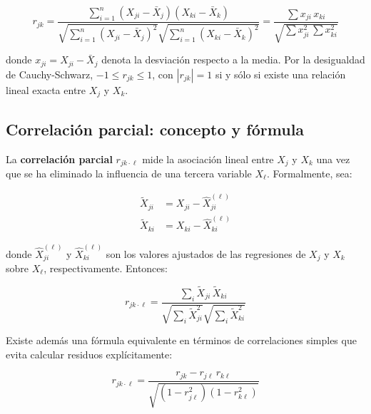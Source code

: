 \documentclass[12pt, letterpaper]{article}
\theoremstyle{remark}
\newcommand{\rp}[2]{r_{#1 \cdot #2}}   %
\begin{document}
\begin{equation}
  r_{jk}
    = \frac{\displaystyle\sum_{i=1}^{n}(X_{ji}-\bar{X}_j)(X_{ki}-\bar{X}_k)}
           {\sqrt{\displaystyle\sum_{i=1}^{n}(X_{ji}-\bar{X}_j)^2}
            \sqrt{\displaystyle\sum_{i=1}^{n}(X_{ki}-\bar{X}_k)^2}}
    = \frac{\sum x_{ji}\,x_{ki}}{\sqrt{\sum x_{ji}^2\,\sum x_{ki}^2}}
  \label{eq:pearson}
\end{equation}

\noindent donde $x_{ji} = X_{ji} - \bar{X}_j$ denota la desviación respecto a la
media. Por la desigualdad de Cauchy-Schwarz, $-1 \le r_{jk} \le 1$, con
$|r_{jk}| = 1$ si y sólo si existe una relación lineal exacta entre $X_j$ y
$X_k$.

\subsection{Correlación parcial: concepto y fórmula}

La \textbf{correlación parcial} $\rp{jk}{\ell}$ mide la asociación lineal entre
$X_j$ y $X_k$ una vez que se ha eliminado la influencia de una tercera variable
$X_\ell$. Formalmente, sea:

\begin{align}
  \tilde{X}_{ji} &= X_{ji} - \hat{X}_{ji}^{(\ell)}
  \label{eq:resid_j}\\
  \tilde{X}_{ki} &= X_{ki} - \hat{X}_{ki}^{(\ell)}
  \label{eq:resid_k}
\end{align}

\noindent donde $\hat{X}_{ji}^{(\ell)}$ y $\hat{X}_{ki}^{(\ell)}$ son los
valores ajustados de las regresiones de $X_j$ y $X_k$ sobre $X_\ell$,
respectivamente. Entonces:

\begin{equation}
  \rp{jk}{\ell}
    = \frac{\displaystyle\sum_{i} \tilde{X}_{ji}\,\tilde{X}_{ki}}
           {\sqrt{\displaystyle\sum_{i}\tilde{X}_{ji}^2}
            \sqrt{\displaystyle\sum_{i}\tilde{X}_{ki}^2}}
  \label{eq:parcial_def}
\end{equation}

Existe además una fórmula equivalente en términos de correlaciones simples que
evita calcular residuos explícitamente:

\begin{equation}
  \boxed{
    \rp{jk}{\ell}
      = \frac{r_{jk} - r_{j\ell}\,r_{k\ell}}
             {\sqrt{(1 - r_{j\ell}^2)(1 - r_{k\ell}^2)}}
  }
  \label{eq:parcial_formula}
\end{equation}
\end{document}
